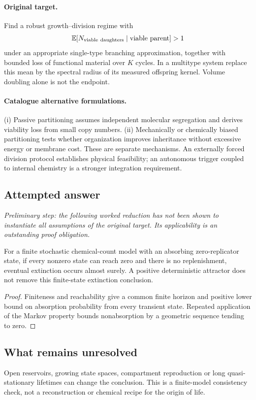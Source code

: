 \documentclass[11pt]{article}
\begin{document}
\paragraph{Original target.}
Find a robust growth--division regime with
\[
\mathbb{E}[N_{\rm viable\ daughters}\mid\text{viable parent}]>1
\]
under an appropriate single-type branching approximation, together with bounded loss of functional material over $K$ cycles. In a multitype system replace this mean by the spectral radius of its measured offspring kernel. Volume doubling alone is not the endpoint.
\paragraph{Catalogue alternative formulations.}
(i) Passive partitioning assumes independent molecular segregation and derives viability loss from small copy numbers. (ii) Mechanically or chemically biased partitioning tests whether organization improves inheritance without excessive energy or membrane cost. These are separate mechanisms. An externally forced division protocol establishes physical feasibility; an autonomous trigger coupled to internal chemistry is a stronger integration requirement.
\subsection{Attempted answer}
\noindent\emph{Preliminary step: the following worked reduction has not been shown to instantiate all assumptions of the original target. Its applicability is an outstanding proof obligation.}

\begin{proposition}
For a finite stochastic chemical-count model with an absorbing zero-replicator state, if every nonzero state can reach zero and there is no replenishment, eventual extinction occurs almost surely. A positive deterministic attractor does not remove this finite-state extinction conclusion.
\end{proposition}
\begin{proof}
Finiteness and reachability give a common finite horizon and positive lower bound on absorption probability from every transient state. Repeated application of the Markov property bounds nonabsorption by a geometric sequence tending to zero.
\end{proof}
\subsection{What remains unresolved}
Open reservoirs, growing state spaces, compartment reproduction or long quasi-stationary lifetimes can change the conclusion. This is a finite-model consistency check, not a reconstruction or chemical recipe for the origin of life.
\end{document}
